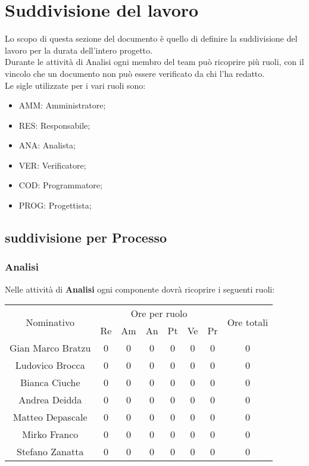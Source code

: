 \chapter{Suddivisione del lavoro}
Lo scopo di questa sezione del documento è quello di definire la suddivisione del lavoro per la durata dell'intero progetto.\\
Durante le attività di Analisi ogni membro del team può ricoprire più ruoli, con il vincolo che un documento non può essere verificato da chi l'ha redatto.\\
Le sigle utilizzate per i vari ruoli sono:
\begin{itemize}
	\item AMM: Amministratore;
	\item RES: Responsabile;
	\item ANA: Analista;
	\item VER: Verificatore;
	\item COD: Programmatore;
	\item PROG: Progettista;
\end{itemize}

\section{suddivisione per Processo}
\subsection{Analisi}
Nelle attività di \textbf{Analisi} ogni componente dovrà ricoprire i seguenti ruoli:

\begin{table}[]
	\begin{tabular}{|c|c|c|c|c|c|c|c|}
		\hline
		\multirow{2}{*}{Nominativo}             & \multicolumn{6}{c|}{Ore per ruolo}                                                                                                                     & \multirow{2}{*}{Ore totali} \\ \cline{2-7}
		& \multicolumn{1}{c|}{Re} & \multicolumn{1}{c|}{Am} & \multicolumn{1}{c|}{An} & \multicolumn{1}{c|}{Pt} & \multicolumn{1}{c|}{Ve} & \multicolumn{1}{c|}{Pr} &                             \\ \hline
			Gian Marco Bratzu	&0	&0	&0	&0	&0	&0	&0     \\
			Ludovico Brocca		&0	&0	&0	&0	&0	&0	&0     \\ 
			Bianca Ciuche		&0	&0	&0	&0	&0	&0	&0     \\ 
			Andrea Deidda		&0	&0	&0	&0	&0	&0	&0     \\
			Matteo Depascale	&0	&0	&0	&0	&0	&0	&0     \\
			Mirko Franco		&0	&0	&0	&0	&0	&0	&0     \\
			Stefano Zanatta		&0	&0	&0	&0	&0	&0	&0     \\ \hline
		               
	\end{tabular}
\end{table}

